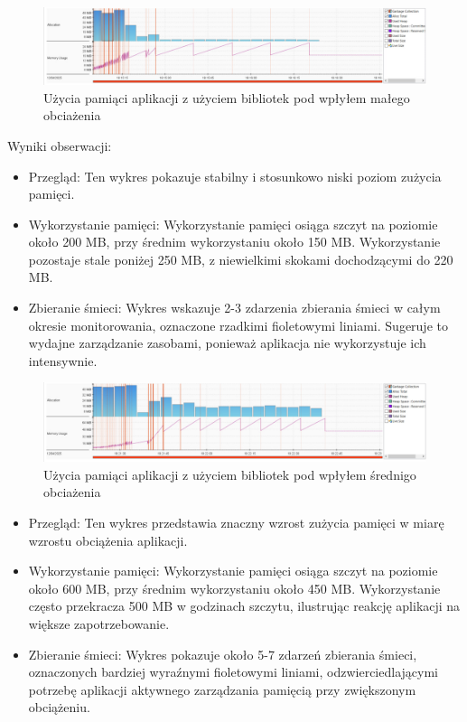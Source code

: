 \documentclass[runningheads,12pt]{llncs}
\begin{document}

\begin{figure}
    \includegraphics[width=\linewidth]{images/sdk-memory-low-graph.jpg}
    \caption{Użycia pamiąci aplikacji z użyciem bibliotek pod wpłyłem małego obciażenia} \label{fig1}
\end{figure}

Wyniki obserwacji:

\begin{itemize}
    \item Przegląd: Ten wykres pokazuje stabilny i stosunkowo niski poziom zużycia pamięci.
    \item Wykorzystanie pamięci: Wykorzystanie pamięci osiąga szczyt na poziomie około 200 MB, przy średnim wykorzystaniu około 150 MB. Wykorzystanie pozostaje stale poniżej 250 MB, z niewielkimi skokami dochodzącymi do 220 MB.
    \item Zbieranie śmieci: Wykres wskazuje 2-3 zdarzenia zbierania śmieci w całym okresie monitorowania, oznaczone rzadkimi fioletowymi liniami. Sugeruje to wydajne zarządzanie zasobami, ponieważ aplikacja nie wykorzystuje ich intensywnie.
\end{itemize}
  

\begin{figure}
    \includegraphics[width=\linewidth]{images/sdk-memory-middle-graph.jpg}
    \caption{Użycia pamiąci aplikacji z użyciem bibliotek pod wpłyłem średnigo obciażenia} \label{fig1}
\end{figure}

\begin{itemize}
    \item Przegląd: Ten wykres przedstawia znaczny wzrost zużycia pamięci w miarę wzrostu obciążenia aplikacji.
    \item Wykorzystanie pamięci: Wykorzystanie pamięci osiąga szczyt na poziomie około 600 MB, przy średnim wykorzystaniu około 450 MB. Wykorzystanie często przekracza 500 MB w godzinach szczytu, ilustrując reakcję aplikacji na większe zapotrzebowanie.
    \item Zbieranie śmieci: Wykres pokazuje około 5-7 zdarzeń zbierania śmieci, oznaczonych bardziej wyraźnymi fioletowymi liniami, odzwierciedlającymi potrzebę aplikacji aktywnego zarządzania pamięcią przy zwiększonym obciążeniu.
\end{itemize}
\end{document}
